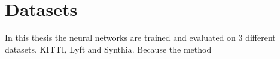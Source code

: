 \section{Datasets}

In this thesis the neural networks are trained and evaluated on 3 different datasets, KITTI\cite{kitti}, Lyft\cite{lyft2019} and Synthia. Because the method 